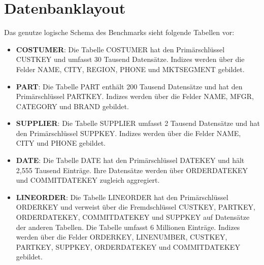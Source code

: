\newpage

\section{Datenbanklayout}

\begin{figure}[htp] 
\end{figure}  

Das genutze logische Schema des Benchmarks sieht folgende Tabellen vor: 
\begin{itemize}
	\item \textbf{{\glqq}COSTUMER{\grqq}}: Die Tabelle {\glqq}COSTUMER{\grqq} hat den Primärschlüssel {\glqq}CUSTKEY{\grqq} und umfasst 30 Tausend Datensätze. Indizes werden über die Felder {\glqq}NAME{\grqq}, {\glqq}CITY{\grqq}, {\glqq}REGION{\grqq}, {\glqq}PHONE{\grqq} und {\glqq}MKTSEGMENT{\grqq} gebildet. 
	\item \textbf{{\glqq}PART{\grqq}}: Die Tabelle {\glqq}PART{\grqq} enthält 200 Tausend Datensätze und hat den Primärschlüssel {\glqq}PARTKEY{\grqq}. Indizes werden über die Felder {\glqq}NAME{\grqq}, {\glqq}MFGR{\grqq}, {\glqq}CATEGORY{\grqq} und {\glqq}BRAND{\grqq} gebildet. 
	\item \textbf{{\glqq}SUPPLIER{\grqq}}: Die Tabelle {\glqq}SUPPLIER{\grqq} umfasst 2 Tausend Datensätze und hat den Primärschlüssel {\glqq}SUPPKEY{\grqq}. Indizes werden über die Felder {\glqq}NAME{\grqq}, {\glqq}CITY{\grqq} und {\glqq}PHONE{\grqq} gebildet. 
	\item \textbf{{\glqq}DATE{\grqq}}: Die Tabelle {\glqq}DATE{\grqq} hat den Primärschlüssel {\glqq}DATEKEY{\grqq} und hält 2,555 Tausend Einträge. Ihre Datensätze werden über {\glqq}ORDERDATEKEY{\grqq} und {\glqq}COMMITDATEKEY{\grqq} zugleich aggregiert. 
	\item \textbf{{\glqq}LINEORDER{\grqq}}: Die Tabelle {\glqq}LINEORDER{\grqq} hat den Primärschlüssel {\glqq}ORDERKEY{\grqq} und verweist über die Fremdschlüssel {\glqq}CUSTKEY{\grqq}, {\glqq}PARTKEY{\grqq}, {\glqq}ORDERDATEKEY{\grqq}, {\glqq}COMMITDATEKEY{\grqq} und {\glqq}SUPPKEY{\grqq} auf Datensätze der anderen Tabellen. Die Tabelle umfasst 6 Millionen Einträge. Indizes werden über die Felder {\glqq}ORDERKEY, {\glqq}LINENUMBER, {\glqq}CUSTKEY{\grqq}, {\glqq}PARTKEY{\grqq}, {\glqq}SUPPKEY{\grqq}, {\glqq}ORDERDATEKEY{\grqq} und {\glqq}COMMITDATEKEY{\grqq} gebildet. 
\end{itemize}







